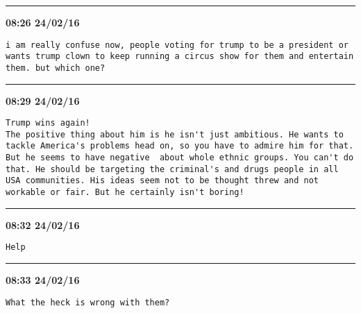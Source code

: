 \hrule%

\begin{adjustwidth}{0cm}{0cm}
\footnotesize \textbf{08:26 24/02/16}

\begin{lstlisting}[breaklines, breakatwhitespace, basicstyle=\small, frame=leftline]
i am really confuse now, people voting for trump to be a president or wants trump clown to keep running a circus show for them and entertain them. but which one?
\end{lstlisting}
\end{adjustwidth}

\hrule%

\begin{adjustwidth}{0cm}{0cm}
\footnotesize \textbf{08:29 24/02/16}

\begin{lstlisting}[breaklines, breakatwhitespace, basicstyle=\small, frame=leftline]
Trump wins again! 
The positive thing about him is he isn't just ambitious. He wants to tackle America's problems head on, so you have to admire him for that. But he seems to have negative  about whole ethnic groups. You can't do that. He should be targeting the criminal's and drugs people in all USA communities. His ideas seem not to be thought threw and not workable or fair. But he certainly isn't boring!
\end{lstlisting}
\end{adjustwidth}

\hrule%

\begin{adjustwidth}{0cm}{0cm}
\footnotesize \textbf{08:32 24/02/16}

\begin{lstlisting}[breaklines, breakatwhitespace, basicstyle=\small, frame=leftline]
Help
\end{lstlisting}
\end{adjustwidth}

\hrule%

\begin{adjustwidth}{0cm}{0cm}
\footnotesize \textbf{08:33 24/02/16}

\begin{lstlisting}[breaklines, breakatwhitespace, basicstyle=\small, frame=leftline]
What the heck is wrong with them?
\end{lstlisting}
\end{adjustwidth}

